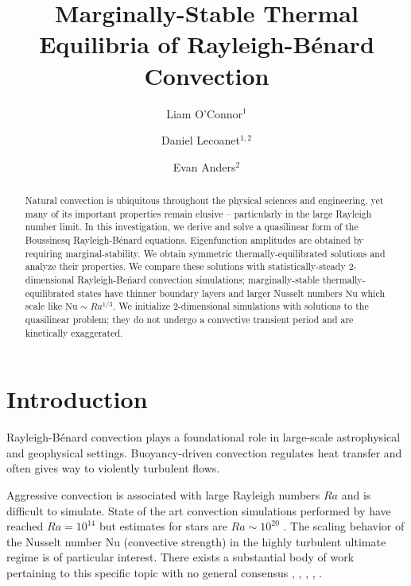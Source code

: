 \documentclass[reprint,amsmath,amssymb,aps]{revtex4-1}
\newcommand\Nu{\mathrm{Nu}}
\begin{document}
\title{Marginally-Stable Thermal Equilibria of Rayleigh-Bénard Convection}

\author{Liam O'Connor$^1$}
\author{Daniel Lecoanet$^{1, 2}$}
\author{Evan Anders$^2$}

\begin{abstract}
Natural convection is ubiquitous throughout the physical sciences and engineering, yet many of its important properties remain elusive -- particularly in the large Rayleigh number limit.
In this investigation, we derive and solve a quasilinear form of the Boussinesq Rayleigh-B\'enard equations. 
Eigenfunction amplitudes are obtained by requiring marginal-stability. We obtain symmetric thermally-equilibrated solutions and analyze their properties. 
We compare these solutions with statistically-steady 2-dimensional Rayleigh-Be\'nard convection simulations; marginally-stable thermally-equilibrated states have thinner boundary layers and larger Nusselt numbers $\Nu$ which scale like $\Nu \sim Ra^{1/3}$. 
We initialize 2-dimensional simulations with solutions to the quasilinear problem; they do not undergo a convective transient period and are kinetically exaggerated.
\end{abstract}


\maketitle

\section{Introduction}
Rayleigh-B\'enard convection plays a foundational role in large-scale astrophysical and geophysical settings.
Buoyancy-driven convection regulates heat transfer and often gives way to violently turbulent flows. 

Aggressive convection is associated with large Rayleigh numbers $Ra$ and is difficult to simulate. State of the art convection simulations performed by \cite{Zhu} have reached $Ra = 10^{14}$ but estimates for stars are $Ra \sim 10^{20}$ \cite{Ossendrijver}. 
The scaling behavior of the Nusselt number $\Nu$ (convective strength) in the highly turbulent ultimate regime is of particular interest.
There exists a substantial body of work pertaining to this specific topic with no general consensus \cite{Malkus}, \cite{Kraichnan} \cite{Spiegel}, \cite{Castaing}, \cite{Grossman}, \cite{Ahlers}. 
\end{document}
